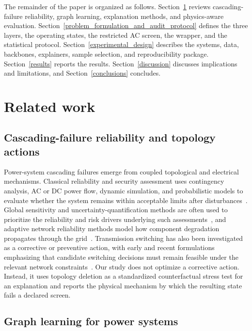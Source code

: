 The remainder of the paper is organized as follows. Section~\ref{related_work} reviews cascading-failure reliability, graph learning, explanation methods, and physics-aware evaluation. Section~\ref{problem_formulation_and_audit_protocol} defines the three layers, the operating states, the restricted AC screen, the wrapper, and the statistical protocol. Section~\ref{experimental_design} describes the systems, data, backbones, explainers, sample selection, and reproducibility package. Section~\ref{results} reports the results. Section~\ref{discussion} discusses implications and limitations, and Section~\ref{conclusions} concludes.

\section{Related work}\label{related_work}

\subsection{Cascading-failure reliability and topology actions}\label{cascading_failure_reliability_and_topology_actions}

Power-system cascading failures emerge from coupled topological and electrical mechanisms. Classical reliability and security assessment uses contingency analysis, AC or DC power flow, dynamic simulation, and probabilistic models to evaluate whether the system remains within acceptable limits after disturbances~\citep{guo2023,cadini2017,gjorgiev2022,zhang2022cyber,zhu2023,gao2025}. Global sensitivity and uncertainty-quantification methods are often used to prioritize the reliability and risk drivers underlying such assessments~\citep{rahman2011,zhang2014,yao2023}, and adaptive network reliability methods model how component degradation propagates through the grid~\citep{dehghani2021}. Transmission switching has also been investigated as a corrective or preventive action, with early and recent formulations emphasizing that candidate switching decisions must remain feasible under the relevant network constraints~\citep{rolim1999,li2019,korad2013,li2017,ding2016,zhang2024rl}. Our study does not optimize a corrective action. Instead, it uses topology deletion as a standardized counterfactual stress test for an explanation and reports the physical mechanism by which the resulting state fails a declared screen.

\subsection{Graph learning for power systems}\label{graph_learning_for_power_systems}

